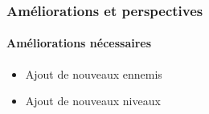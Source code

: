 \begin{frame}

\frametitle{Améliorations et perspectives}
	\framesubtitle{Améliorations nécessaires}

	\begin{itemize}
		\item{Ajout de nouveaux ennemis}
	\end{itemize}

	\begin{itemize}
		\item{Ajout de nouveaux niveaux}
	\end{itemize}

	
\end{frame}
